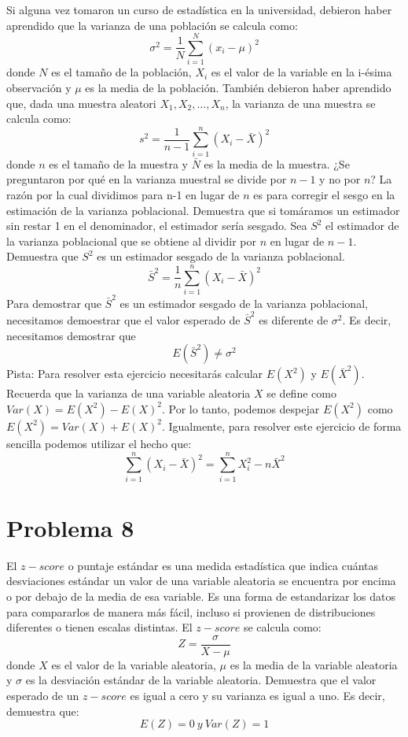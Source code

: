 \documentclass[]{article}
\begin{document}
Si alguna vez tomaron un curso de estadística en la universidad, debieron haber aprendido que la varianza de una población se calcula como: 
$$
\sigma^2=
	\frac{1}{N} 
	\sum_{i=1}^{N}
	(x_i-\mu)^2
$$
donde $N$ es el tamaño de la población, $X_i$ es el valor de la variable en la i-ésima observación y $\mu$ es la media de la población.
También debieron haber aprendido que, dada una muestra aleatori ${X_1,X_2,...,X_n}$, la varianza de una muestra se calcula como:
$$
s^2=
	\frac{1}{n-1}
	\sum_{i=1}^{n}
	(X_i-\bar{X})^2
$$
donde $n$ es el tamaño de la muestra y $\bar{N}$ es la media de la muestra. ¿Se preguntaron por qué en la varianza muestral se divide por $n-1$ y no por $n$? La razón por la cual dividimos para n-1 en lugar de $n$ es para corregir el sesgo en la estimación de la varianza poblacional.
Demuestra que si tomáramos un estimador sin restar 1 en el denominador, el estimador sería sesgado. Sea $S^2$ el estimador de la varianza poblacional que se obtiene al dividir por $n$ en lugar de $n-1$. Demuestra que $S^2$ es un estimador sesgado de la varianza poblacional.
$$
\bar{S}^2=
	\frac{1}{n}
	\sum_{i=1}^{n}	
	(X_i-\bar{X})^2
$$
Para demostrar que $\bar{S}^2$ es un estimador sesgado de la varianza poblacional, necesitamos demoestrar que el valor esperado de $\bar{S}^2$ es diferente de $\sigma^2$. Es decir, necesitamos demostrar que
$$
E(\bar{S}^2)\neq\sigma^2
$$
Pista: Para resolver esta ejercicio necesitarás calcular $E(X^2)$ y $E(\bar{X}^2)$. Recuerda que la varianza de una variable aleatoria $X$ se define como $Var(X)=E(X^2)-E(X)^2$. Por lo tanto, podemos despejar $E(X^2)$ como $E(X^2)=Var(X)+E(X)^2$.
Igualmente, para resolver este ejercicio de forma sencilla podemos utilizar el hecho que: 
$$
\sum_{i=1}^{n} (X_i-\bar{X})^2=
	\sum_{i=1}^{n}
	X_{i}^{2}
	-
	n
	\bar{X}^2
$$ 

\section*{Problema 8}

El $z-score$ o puntaje estándar es una medida estadística que indica cuántas desviaciones estándar un valor de una variable aleatoria se encuentra por encima o por debajo de la media de esa variable. Es una forma de estandarizar los datos para compararlos de manera más fácil, incluso si provienen de distribuciones diferentes o tienen escalas distintas. El $z-score$ se calcula como:
$$
Z=
\frac{\sigma}{X-\mu}
$$
donde $X$ es el valor de la variable aleatoria, $\mu$ es la media de la variable aleatoria y $\sigma$ es la desviación estándar de la variable aleatoria. 
Demuestra que el valor esperado de un $z-score$ es igual a cero y su varianza es igual a uno. Es decir, demuestra que: 
$$
E(Z)=0 \ y \ Var(Z)=1
$$
\end{document}

